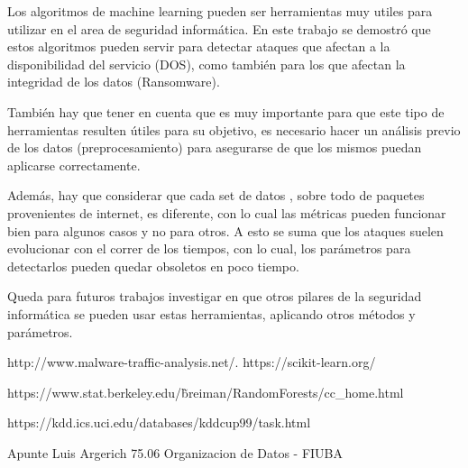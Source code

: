 \documentclass[a4paper,10pt]{article}
\begin{document}
Los algoritmos de machine learning pueden ser herramientas muy utiles para utilizar en el area de seguridad inform\'atica. En este trabajo se demostr\'o que estos algoritmos pueden servir para detectar ataques que afectan a la disponibilidad del servicio (DOS), como tambi\'en para los que afectan la integridad de los datos (Ransomware). 

Tambi\'en hay que tener en cuenta que es muy importante para que este tipo de herramientas resulten \'utiles para su objetivo, es necesario hacer un an\'alisis previo de los datos (preprocesamiento) para asegurarse de que los mismos puedan aplicarse correctamente.

Adem\'as, hay que considerar que cada set de datos      , sobre todo de paquetes provenientes de internet, es diferente, con lo cual las m\'etricas pueden funcionar bien para algunos casos y no para otros. A esto se suma que los ataques suelen evolucionar con el correr de los tiempos, con lo cual, los par\'ametros para detectarlos pueden quedar obsoletos en poco tiempo.

Queda para futuros trabajos investigar en que otros pilares de la seguridad inform\'atica se pueden usar estas herramientas, aplicando otros m\'etodos y par\'ametros.
\newpage




\begin{thebibliography}{9}
  http://www.malware-traffic-analysis.net/.
 https://scikit-learn.org/

 https://www.stat.berkeley.edu/\~breiman/RandomForests/cc\_home.html

 https://kdd.ics.uci.edu/databases/kddcup99/task.html


 Apunte Luis Argerich 75.06 Organizacion de Datos - FIUBA
\end{thebibliography}
\end{document}
